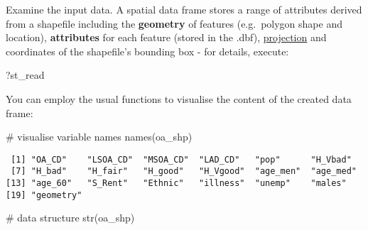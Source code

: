 \documentclass[
  letterpaper,
  krantz2]{style/krantz}
\newenvironment{Shaded}{\begin{snugshade}}{\end{snugshade}}
\newcommand{\CommentTok}[1]{\textcolor[rgb]{0.37,0.37,0.37}{#1}}
\newcommand{\FunctionTok}[1]{\textcolor[rgb]{0.28,0.35,0.67}{#1}}
\newcommand{\NormalTok}[1]{\textcolor[rgb]{0.00,0.23,0.31}{#1}}
\begin{document}
Examine the input data. A spatial data frame stores a range of
attributes derived from a shapefile including the \textbf{geometry} of
features (e.g.~polygon shape and location), \textbf{attributes} for each
feature (stored in the .dbf),
\href{https://en.wikipedia.org/wiki/Map_projection}{projection} and
coordinates of the shapefile's bounding box - for details, execute:

\begin{Shaded}
\begin{Highlighting}[]
\NormalTok{?st\_read}
\end{Highlighting}
\end{Shaded}

You can employ the usual functions to visualise the content of the
created data frame:

\begin{Shaded}
\begin{Highlighting}[]
\CommentTok{\# visualise variable names}
\FunctionTok{names}\NormalTok{(oa\_shp)}
\end{Highlighting}
\end{Shaded}

\begin{verbatim}
 [1] "OA_CD"    "LSOA_CD"  "MSOA_CD"  "LAD_CD"   "pop"      "H_Vbad"  
 [7] "H_bad"    "H_fair"   "H_good"   "H_Vgood"  "age_men"  "age_med" 
[13] "age_60"   "S_Rent"   "Ethnic"   "illness"  "unemp"    "males"   
[19] "geometry"
\end{verbatim}

\begin{Shaded}
\begin{Highlighting}[]
\CommentTok{\# data structure}
\FunctionTok{str}\NormalTok{(oa\_shp)}
\end{Highlighting}
\end{Shaded}
\end{document}
